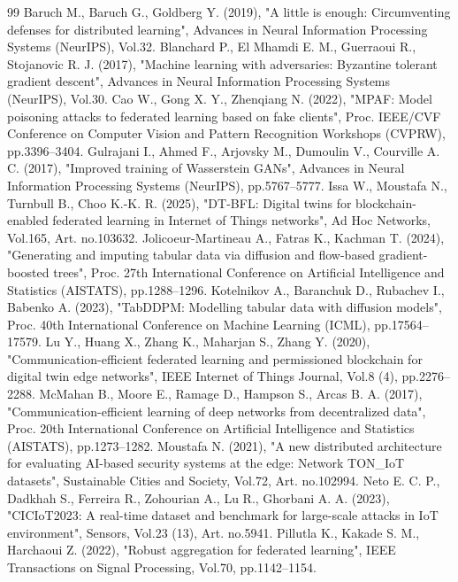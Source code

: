 \begin{thebibliography}{99}
 Baruch M., Baruch G., Goldberg Y. (2019), "A little is enough: Circumventing defenses for distributed learning", Advances in Neural Information Processing Systems (NeurIPS), Vol.32.
 Blanchard P., El Mhamdi E. M., Guerraoui R., Stojanovic R. J. (2017), "Machine learning with adversaries: Byzantine tolerant gradient descent", Advances in Neural Information Processing Systems (NeurIPS), Vol.30.
 Cao W., Gong X. Y., Zhenqiang N. (2022), "MPAF: Model poisoning attacks to federated learning based on fake clients", Proc. IEEE/CVF Conference on Computer Vision and Pattern Recognition Workshops (CVPRW), pp.3396--3404.
 Gulrajani I., Ahmed F., Arjovsky M., Dumoulin V., Courville A. C. (2017), "Improved training of Wasserstein GANs", Advances in Neural Information Processing Systems (NeurIPS), pp.5767--5777.
 Issa W., Moustafa N., Turnbull B., Choo K.-K. R. (2025), "DT-BFL: Digital twins for blockchain-enabled federated learning in Internet of Things networks", Ad Hoc Networks, Vol.165, Art. no.103632.
 Jolicoeur-Martineau A., Fatras K., Kachman T. (2024), "Generating and imputing tabular data via diffusion and flow-based gradient-boosted trees", Proc. 27th International Conference on Artificial Intelligence and Statistics (AISTATS), pp.1288--1296.
 Kotelnikov A., Baranchuk D., Rubachev I., Babenko A. (2023), "TabDDPM: Modelling tabular data with diffusion models", Proc. 40th International Conference on Machine Learning (ICML), pp.17564--17579.
 Lu Y., Huang X., Zhang K., Maharjan S., Zhang Y. (2020), "Communication-efficient federated learning and permissioned blockchain for digital twin edge networks", IEEE Internet of Things Journal, Vol.8 (4), pp.2276--2288.
 McMahan B., Moore E., Ramage D., Hampson S., Arcas B. A. (2017), "Communication-efficient learning of deep networks from decentralized data", Proc. 20th International Conference on Artificial Intelligence and Statistics (AISTATS), pp.1273--1282.
 Moustafa N. (2021), "A new distributed architecture for evaluating AI-based security systems at the edge: Network TON\_IoT datasets", Sustainable Cities and Society, Vol.72, Art. no.102994.
 Neto E. C. P., Dadkhah S., Ferreira R., Zohourian A., Lu R., Ghorbani A. A. (2023), "CICIoT2023: A real-time dataset and benchmark for large-scale attacks in IoT environment", Sensors, Vol.23 (13), Art. no.5941.
 Pillutla K., Kakade S. M., Harchaoui Z. (2022), "Robust aggregation for federated learning", IEEE Transactions on Signal Processing, Vol.70, pp.1142--1154.

\end{thebibliography}
